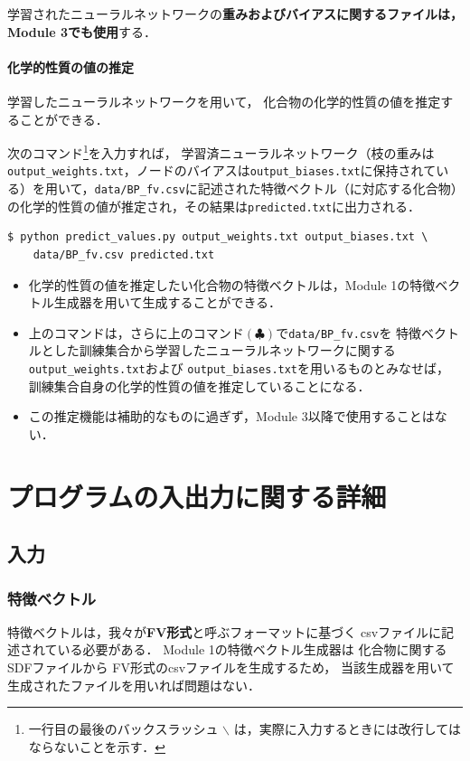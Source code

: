\documentclass[11pt,dvipdfmx,twoside]{jarticle}
\begin{document}
学習されたニューラルネットワークの{\bf 重みおよびバイアスに関するファイルは，Module 3でも使用}する．


\paragraph{化学的性質の値の推定}
学習したニューラルネットワークを用いて，
化合物の化学的性質の値を推定することができる．

次のコマンド\footnote{一行目の最後のバックスラッシュ $\backslash$ は，実際に入力するときには改行してはならないことを示す．}を入力すれば，
学習済ニューラルネットワーク（枝の重みは\verb|output_weights.txt|，ノードのバイアスは\verb|output_biases.txt|に保持されている）を用いて，\verb|data/BP_fv.csv|に記述された特徴ベクトル（に対応する化合物）の化学的性質の値が推定され，その結果は\verb|predicted.txt|に出力される．

\begin{oframed}
  {\small
\begin{verbatim}
$ python predict_values.py output_weights.txt output_biases.txt \
    data/BP_fv.csv predicted.txt
\end{verbatim}
}
  \end{oframed}

\begin{itemize}
\item 化学的性質の値を推定したい化合物の特徴ベクトルは，Module 1の特徴ベクトル生成器を用いて生成することができる．
\item 上のコマンドは，さらに上のコマンド$(\clubsuit)$で\verb|data/BP_fv.csv|を
  特徴ベクトルとした訓練集合から学習したニューラルネットワークに関する \verb|output_weights.txt|および \verb|output_biases.txt|を用いるものとみなせば，
  訓練集合自身の化学的性質の値を推定していることになる．
\item この推定機能は補助的なものに過ぎず，Module 3以降で使用することはない．
\end{itemize}


\section{プログラムの入出力に関する詳細}
\label{sec:io}

\subsection{入力}
\subsubsection{特徴ベクトル}
特徴ベクトルは，我々が{\bf FV形式}と呼ぶフォーマットに基づく
csvファイルに記述されている必要がある．
Module 1の特徴ベクトル生成器は
化合物に関するSDFファイルから
FV形式のcsvファイルを生成するため，
当該生成器を用いて生成されたファイルを用いれば問題はない．
\end{document}
